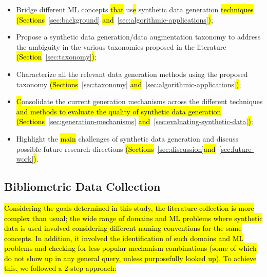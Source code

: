 \begin{itemize}

    \item Bridge different ML concepts \hl{that} us\hl{e} synthetic data generation
        \hl{techniques} \hl{(Sections}~\ref{sec:background}\hl{
        and}~\ref{sec:algorithmic-applications}\hl{)};

    \item Propose a synthetic data generation/data augmentation taxonomy to
        address the ambiguity in the various taxonomies proposed in the
        literature \hl{(Section}~\ref{sec:taxonomy}\hl{)};

    \item Characterize all the relevant data generation methods using the
        proposed taxonomy \hl{(Sections}~\ref{sec:taxonomy}\hl{
        and}~\ref{sec:algorithmic-applications}\hl{)};

    \item \hl{C}onsolidate the current generation mechanisms across the
        different techniques \hl{and methods to evaluate the quality of
        synthetic data generation (Sections}~\ref{sec:generation-mechanisms}
        \hl{and}~\ref{sec:evaluating-synthetic-data}\hl{)};

    \item Highlight the \hl{main} challenges of synthetic data generation and
        discuss possible future research directions
        \hl{(Sections}~\ref{sec:discussion}\hl{and}~\ref{sec:future-work}\hl{)}.

\end{itemize}

\subsection{Bibliometric Data Collection}

\hl{Considering the goals determined in this study, the literature collection is
more complex than usual; the wide range of domains and ML problems where
synthetic data is used involved considering different naming conventions for
the same concepts. In addition, it involved the identification of such domains
and ML problems and checking for less popular mechanism combinations (some of
which do not show up in any general query, unless purposefully looked up). To
achieve this, we followed a 2-step approach:}

